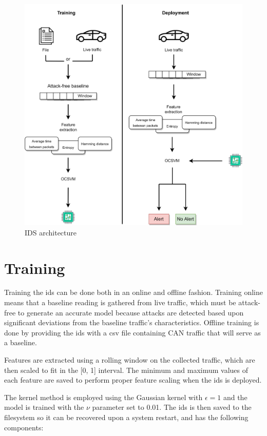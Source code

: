 \begin{figure}
    \centering
    \includegraphics[width = \textwidth]{img/parts/app/IDS.png}
    \caption{IDS architecture}
    \label{fig:ids_architecture}
\end{figure}

\section{Training}

Training the \gls{ids} can be done both in an online and offline fashion. Training online means that a baseline reading is gathered from live traffic, which must be attack-free to generate an accurate model because attacks are detected based upon significant deviations from the baseline traffic's characteristics. Offline training is done by providing the \gls{ids} with a \gls{csv} file containing CAN traffic that will serve as a baseline.\par
Features are extracted using a rolling window on the collected traffic, which are then scaled to fit in the [0, 1] interval. The minimum and maximum values of each feature are saved to perform proper feature scaling when the \gls{ids} is deployed.\par
The kernel method is employed using the Gaussian kernel with $\epsilon = 1$ and the model is trained with the $\nu$ parameter set to 0.01. The \gls{ids} is then saved to the filesystem so it can be recovered upon a system restart, and has the following components:

